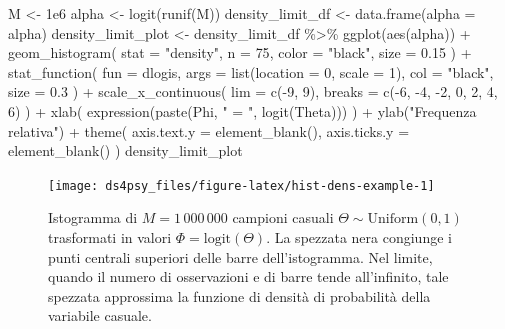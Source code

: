 \documentclass[
  11pt,
]{krantz}
\makeatletter
\newenvironment{Shaded}{\begin{snugshade}}{\end{snugshade}}
\newcommand{\AttributeTok}[1]{\textcolor[rgb]{0.61,0.61,0.61}{#1}}
\newcommand{\DecValTok}[1]{\textcolor[rgb]{0.06,0.06,0.06}{#1}}
\newcommand{\FloatTok}[1]{\textcolor[rgb]{0.06,0.06,0.06}{#1}}
\newcommand{\FunctionTok}[1]{\textcolor[rgb]{0,0,0}{#1}}
\newcommand{\NormalTok}[1]{#1}
\newcommand{\OtherTok}[1]{\textcolor[rgb]{0.37,0.37,0.37}{#1}}
\newcommand{\SpecialCharTok}[1]{\textcolor[rgb]{0,0,0}{#1}}
\newcommand{\StringTok}[1]{\textcolor[rgb]{0.5,0.5,0.5}{#1}}
\newenvironment{kframe}{%
\medskip{}
\setlength{\fboxsep}{.8em}
 \def\at@end@of@kframe{}%
 \ifinner\ifhmode%
  \def\at@end@of@kframe{\end{minipage}}%
  \begin{minipage}{\columnwidth}%
 \fi\fi%
 \def\FrameCommand##1{\hskip\@totalleftmargin \hskip-\fboxsep
 \colorbox{shadecolor}{##1}\hskip-\fboxsep
     \hskip-\linewidth \hskip-\@totalleftmargin \hskip\columnwidth}%
 \MakeFramed {\advance\hsize-\width
   \@totalleftmargin\z@ \linewidth\hsize
   \@setminipage}}%
 {\par\unskip\endMakeFramed%
 \at@end@of@kframe}
\renewenvironment{Shaded}{\begin{kframe}}{\end{kframe}}
\theoremstyle{definition}
\theoremstyle{definition}
\theoremstyle{definition}
\theoremstyle{definition}
\theoremstyle{remark}
\makeatother
\begin{document}
\begin{Shaded}
\begin{Highlighting}[]
\NormalTok{M }\OtherTok{\textless{}{-}} \FloatTok{1e6}
\NormalTok{alpha }\OtherTok{\textless{}{-}} \FunctionTok{logit}\NormalTok{(}\FunctionTok{runif}\NormalTok{(M))}
\NormalTok{density\_limit\_df }\OtherTok{\textless{}{-}} \FunctionTok{data.frame}\NormalTok{(}\AttributeTok{alpha =}\NormalTok{ alpha)}
\NormalTok{density\_limit\_plot }\OtherTok{\textless{}{-}}
\NormalTok{  density\_limit\_df }\SpecialCharTok{\%\textgreater{}\%}
  \FunctionTok{ggplot}\NormalTok{(}\FunctionTok{aes}\NormalTok{(alpha)) }\SpecialCharTok{+}
  \FunctionTok{geom\_histogram}\NormalTok{(}
    \AttributeTok{stat =} \StringTok{"density"}\NormalTok{, }\AttributeTok{n =} \DecValTok{75}\NormalTok{, }\AttributeTok{color =} \StringTok{"black"}\NormalTok{, }\AttributeTok{size =} \FloatTok{0.15}
\NormalTok{  ) }\SpecialCharTok{+}
  \FunctionTok{stat\_function}\NormalTok{(}
    \AttributeTok{fun =}\NormalTok{ dlogis,}
    \AttributeTok{args =} \FunctionTok{list}\NormalTok{(}\AttributeTok{location =} \DecValTok{0}\NormalTok{, }\AttributeTok{scale =} \DecValTok{1}\NormalTok{),}
    \AttributeTok{col =} \StringTok{"black"}\NormalTok{,}
    \AttributeTok{size =} \FloatTok{0.3}
\NormalTok{  ) }\SpecialCharTok{+}
  \FunctionTok{scale\_x\_continuous}\NormalTok{(}
    \AttributeTok{lim =} \FunctionTok{c}\NormalTok{(}\SpecialCharTok{{-}}\DecValTok{9}\NormalTok{, }\DecValTok{9}\NormalTok{),}
    \AttributeTok{breaks =} \FunctionTok{c}\NormalTok{(}\SpecialCharTok{{-}}\DecValTok{6}\NormalTok{, }\SpecialCharTok{{-}}\DecValTok{4}\NormalTok{, }\SpecialCharTok{{-}}\DecValTok{2}\NormalTok{, }\DecValTok{0}\NormalTok{, }\DecValTok{2}\NormalTok{, }\DecValTok{4}\NormalTok{, }\DecValTok{6}\NormalTok{)}
\NormalTok{  ) }\SpecialCharTok{+}
  \FunctionTok{xlab}\NormalTok{(}
    \FunctionTok{expression}\NormalTok{(}\FunctionTok{paste}\NormalTok{(Phi, }\StringTok{" = "}\NormalTok{, }\FunctionTok{logit}\NormalTok{(Theta)))}
\NormalTok{  ) }\SpecialCharTok{+}
  \FunctionTok{ylab}\NormalTok{(}\StringTok{"Frequenza relativa"}\NormalTok{) }\SpecialCharTok{+}
  \FunctionTok{theme}\NormalTok{(}
    \AttributeTok{axis.text.y =} \FunctionTok{element\_blank}\NormalTok{(),}
    \AttributeTok{axis.ticks.y =} \FunctionTok{element\_blank}\NormalTok{()}
\NormalTok{  )}
\NormalTok{density\_limit\_plot}
\end{Highlighting}
\end{Shaded}

\begin{figure}[h]

{\centering \texttt{[image: ds4psy\_files/figure-latex/hist-dens-example-1]} 

}

\caption{Istogramma di $M = 1\,000\,000$ campioni casuali $\Theta \sim \mbox{Uniform}(0,1)$ trasformati in valori $\Phi = \mbox{logit}(\Theta)$. La spezzata nera congiunge i punti centrali superiori delle barre dell'istogramma. Nel limite, quando il numero di osservazioni e di barre tende all'infinito, tale spezzata approssima la funzione di densità di probabilità della variabile casuale.}\label{fig:hist-dens-example}
\end{figure}
\end{document}
